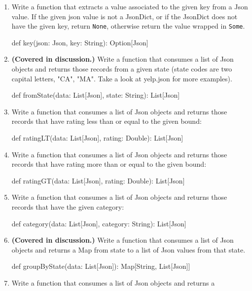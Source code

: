 \documentclass[9pt]{extbook}
\begin{document}
\begin{enumerate}
    \item Write a function that extracts a value associated to the given key
    from a Json value. If the given json value is not a JsonDict, or if the
    JsonDict does not have the given key, return \verb|None|, otherwise return
    the value wrapped in \verb|Some|.
    \begin{scalacode}
    def key(json: Json, key: String): Option[Json]
    \end{scalacode}
    \item \textbf{(Covered in discussion.)} Write a function that consumes a
    list of Json objects and returns those records from a given state (state
    codes are two capital letters, "CA", "MA". Take a look at yelp.json for
    more examples).
    \begin{scalacode}
    def fromState(data: List[Json], state: String): List[Json]
    \end{scalacode}
    \item Write a function that consumes a list of Json objects and returns
    those records that have rating less than or equal to the given bound:
    \begin{scalacode}
    def ratingLT(data: List[Json], rating: Double): List[Json]
    \end{scalacode}
    \item Write a function that consumes a list of Json objects and returns
    those records that have rating more than or equal to the given bound:
    \begin{scalacode}
    def ratingGT(data: List[Json], rating: Double): List[Json]
    \end{scalacode}
    \item Write a function that consumes a list of Json objects and returns
    those records that have the given category:
    \begin{scalacode}
    def category(data: List[Json], category: String): List[Json]
    \end{scalacode}
    \item \textbf{(Covered in discussion.)} Write a function that consumes a
    list of Json objects and returns a Map from state to a list of Json values
    from that state.
    \begin{scalacode}
    def groupByState(data: List[Json]): Map[String, List[Json]]
    \end{scalacode}
    \item Write a function that consumes a list of Json objects and returns a

\end{enumerate}
\end{document}

